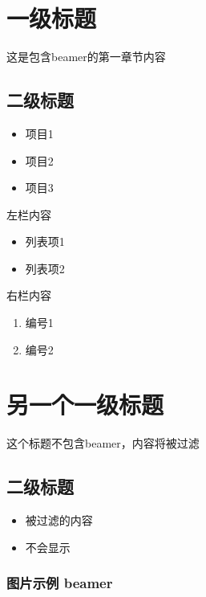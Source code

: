\section{一级标题}\label{ux4e00ux7ea7ux6807ux9898}

这是包含beamer的第一章节内容

\subsection{二级标题}\label{ux4e8cux7ea7ux6807ux9898}

\begin{itemize}
\tightlist
\item
  项目1
\item
  项目2
\item
  项目3
\end{itemize}

左栏内容

\begin{itemize}
\tightlist
\item
  列表项1
\item
  列表项2
\end{itemize}

右栏内容

\begin{enumerate}
\def\labelenumi{\arabic{enumi}.}
\tightlist
\item
  编号1
\item
  编号2
\end{enumerate}

\section{另一个一级标题}\label{ux53e6ux4e00ux4e2aux4e00ux7ea7ux6807ux9898}

这个标题不包含beamer，内容将被过滤

\subsection{二级标题}\label{ux4e8cux7ea7ux6807ux9898-1}

\begin{itemize}
\tightlist
\item
  被过滤的内容
\item
  不会显示
\end{itemize}

\subsubsection{图片示例 beamer}\label{ux56feux7247ux793aux4f8b-beamer}

